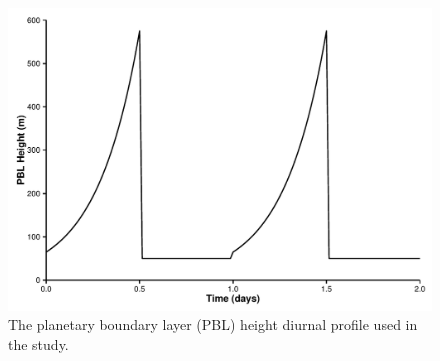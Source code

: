 \begin{figure}%
    \centering%
    \caption{The planetary boundary layer (PBL) height diurnal profile used in the study.}%
    \label{f:PBL_profile}%
    \includegraphics[width=\textwidth]{img/PBL_time_series}
\end{figure}
